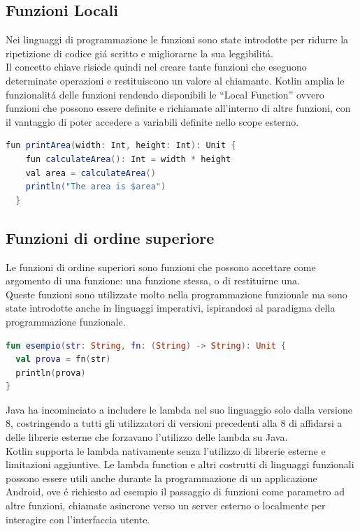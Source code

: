 \subsection{Funzioni Locali}
Nei linguaggi di programmazione le funzioni sono state introdotte per ridurre la ripetizione di codice gi\'a scritto e migliorarne la sua leggibilit\'a.\\
Il concetto chiave risiede quindi nel creare tante funzioni che eseguono determinate operazioni e restituiscono un valore al chiamante.
Kotlin amplia le funzionalit\'a delle funzioni rendendo disponibili le ``Local Function'' ovvero funzioni che possono essere definite e richiamate all'interno di altre funzioni, con il vantaggio di poter accedere a variabili definite nello scope esterno.

\begin{lstlisting}[language=java,caption={Esempio Funzioni locali}]
  fun printArea(width: Int, height: Int): Unit {
    fun calculateArea(): Int = width * height
    val area = calculateArea()
    println("The area is $area")
  }
\end{lstlisting}

\subsection{Funzioni di ordine superiore }
Le funzioni di ordine superiori sono funzioni che possono accettare come argomento di una funzione: una funzione stessa, o di restituirne una.\\
Queste funzioni sono utilizzate molto nella programmazione funzionale ma sono state introdotte anche in linguaggi imperativi, ispirandosi al paradigma della programmazione funzionale. \\

\begin{lstlisting}[language=kotlin,caption={Funzioni ordine superiore}]
fun esempio(str: String, fn: (String) -> String): Unit {
  val prova = fn(str)
  println(prova)
}
\end{lstlisting}

Java ha incominciato a includere le lambda nel suo linguaggio solo dalla versione 8, costringendo a tutti gli utilizzatori di versioni precedenti alla 8 di affidarsi a delle librerie esterne che forzavano l'utilizzo delle lambda su Java. \\
Kotlin  supporta le lambda nativamente senza l'utilizzo di librerie esterne e limitazioni aggiuntive.
Le lambda function e altri costrutti di linguaggi funzionali possono essere utili anche durante la programmazione di un applicazione Android, ove \'e richiesto ad esempio il passaggio di funzioni come parametro ad altre funzioni, chiamate asincrone verso un server esterno o localmente per interagire con l'interfaccia utente.

